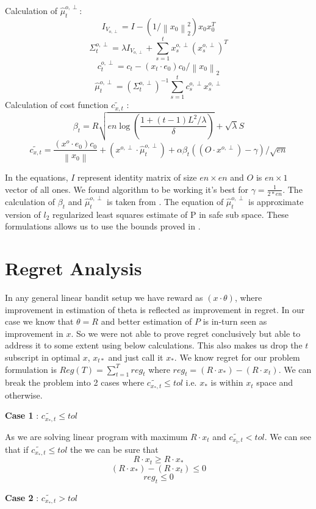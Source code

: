 \documentclass[BTech,thesis]{iitmdiss}
\newcommand{\norm}[1]{\left\lVert#1\right\rVert}
\begin{document}
Calculation of $\widehat{\mu}^{o,\perp}_t$:
$$ I_{V_{o,\perp}} = I - (1/\norm{x_0}^2_2)x_0x_0^T $$
$$ \Sigma_{t}^{o,\perp} = \lambda  I_{V_{o,\perp}} + \sum_{s=1}^{t} x_{s}^{o,\perp} (x_{s}^{o,\perp})^T$$
$$ c_{t}^{o,\perp} = c_t - (x_t \cdot e_0)c_0/\norm{x_0}_2 $$
$$ \widehat{\mu}^{o,\perp}_t = ( \Sigma_{t}^{o,\perp})^{-1} \sum_{s=1}^{t} c_{s}^{o,\perp}x_{s}^{o,\perp}$$
Calculation of cost function $\widetilde{c_{x,t}}$ :
$$ \beta_t = R\sqrt{en\log(\frac{1+(t-1)L^2 /\lambda}{\delta})} + \sqrt{\lambda}S $$
$$ \widetilde{c_{x,t}} = \frac{(x^o\cdot e_0)c_0}{\norm{x_0}} + (x^{o,\perp}\cdot \widehat{\mu}^{o,\perp}_t)  + \alpha\beta_t ( (O\cdot x^{o,\perp}) - \gamma)/\sqrt{en} $$

In the equations, $I$ represent identity matrix of size $en\times en$ and $O$ is $en\times 1$ vector of all ones. We found algorithm to be working it's best for $\gamma = \frac{1}{2*en}$. The calculation of $\beta_t$ and $\widehat{\mu}^{o,\perp}_t$ is taken from \cite{pan:pr:sblc}. The equation of $\widehat{\mu}^{o,\perp}_t$ is approximate version of $l_2$ regularized least squares estimate of P in safe sub space. These formulations allows us to use the bounds proved in \cite{pan:pr:slb}.  

\section{Regret Analysis}
In any general linear bandit setup we have reward as $(x\cdot \theta)$, where improvement in estimation of theta is reflected as improvement in regret. In our case we know that $\theta = R$ and better estimation of $P$ is in-turn seen as improvement in $x$. So we were not able to prove regret conclusively but able to address it to some extent using below calculations. This also makes us drop the $t$ subscript in optimal $x$, $x_{t*}$ and just call it $x_*$. We know regret for our problem formulation is $Reg(T) = \sum_{t=1}^{T}reg_t$ where $reg_t = (R\cdot x_*) - (R\cdot x_t)$. We can break the problem into 2 cases where $\widetilde{c_{x_*,t}} \leq tol$ i.e. $x_*$ is within $x_t$ space and otherwise. 

\textbf{Case 1} : $\widetilde{c_{x_*,t}} \leq tol$

As we are solving linear program with maximum $R\cdot x_t$ and $\widetilde{c_{x_t,t}} < tol$. We can see that if $\widetilde{c_{x_*,t}} \leq tol$ the we can be sure that 
$$ R\cdot x_t  \geq R\cdot x_* $$
$$ (R\cdot x_*) - (R\cdot x_t) \leq 0 $$
$$ reg_t \leq 0 $$

\textbf{Case 2} : $\widetilde{c_{x_*,t}} > tol$
\end{document}
